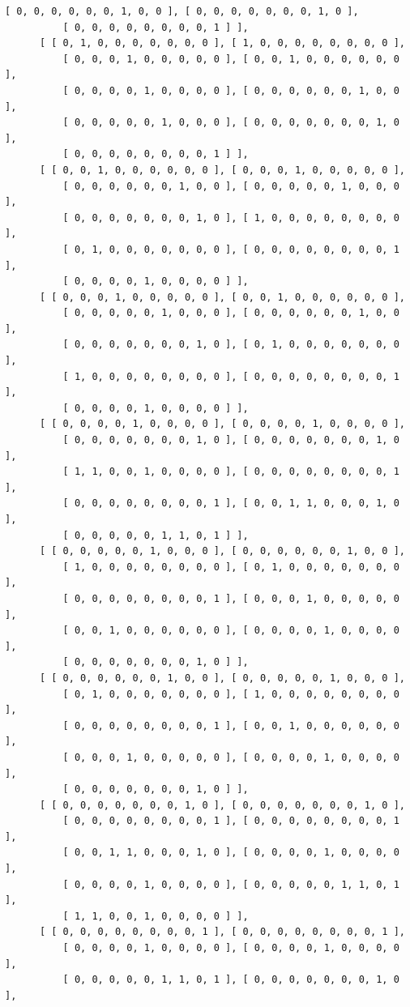 \documentclass[a4paper, 10pt]{book}
\theoremstyle{definition}
\numberwithin{equation}{chapter}
\begin{document}
\begin{appendices}
\begin{enumerate}
\begin{lstlisting}[numbers=none]
          [ 0, 0, 0, 0, 0, 0, 1, 0, 0 ], [ 0, 0, 0, 0, 0, 0, 0, 1, 0 ], 
          [ 0, 0, 0, 0, 0, 0, 0, 0, 1 ] ], 
      [ [ 0, 1, 0, 0, 0, 0, 0, 0, 0 ], [ 1, 0, 0, 0, 0, 0, 0, 0, 0 ], 
          [ 0, 0, 0, 1, 0, 0, 0, 0, 0 ], [ 0, 0, 1, 0, 0, 0, 0, 0, 0 ], 
          [ 0, 0, 0, 0, 1, 0, 0, 0, 0 ], [ 0, 0, 0, 0, 0, 0, 1, 0, 0 ], 
          [ 0, 0, 0, 0, 0, 1, 0, 0, 0 ], [ 0, 0, 0, 0, 0, 0, 0, 1, 0 ], 
          [ 0, 0, 0, 0, 0, 0, 0, 0, 1 ] ], 
      [ [ 0, 0, 1, 0, 0, 0, 0, 0, 0 ], [ 0, 0, 0, 1, 0, 0, 0, 0, 0 ], 
          [ 0, 0, 0, 0, 0, 0, 1, 0, 0 ], [ 0, 0, 0, 0, 0, 1, 0, 0, 0 ], 
          [ 0, 0, 0, 0, 0, 0, 0, 1, 0 ], [ 1, 0, 0, 0, 0, 0, 0, 0, 0 ], 
          [ 0, 1, 0, 0, 0, 0, 0, 0, 0 ], [ 0, 0, 0, 0, 0, 0, 0, 0, 1 ], 
          [ 0, 0, 0, 0, 1, 0, 0, 0, 0 ] ], 
      [ [ 0, 0, 0, 1, 0, 0, 0, 0, 0 ], [ 0, 0, 1, 0, 0, 0, 0, 0, 0 ], 
          [ 0, 0, 0, 0, 0, 1, 0, 0, 0 ], [ 0, 0, 0, 0, 0, 0, 1, 0, 0 ], 
          [ 0, 0, 0, 0, 0, 0, 0, 1, 0 ], [ 0, 1, 0, 0, 0, 0, 0, 0, 0 ], 
          [ 1, 0, 0, 0, 0, 0, 0, 0, 0 ], [ 0, 0, 0, 0, 0, 0, 0, 0, 1 ], 
          [ 0, 0, 0, 0, 1, 0, 0, 0, 0 ] ], 
      [ [ 0, 0, 0, 0, 1, 0, 0, 0, 0 ], [ 0, 0, 0, 0, 1, 0, 0, 0, 0 ], 
          [ 0, 0, 0, 0, 0, 0, 0, 1, 0 ], [ 0, 0, 0, 0, 0, 0, 0, 1, 0 ], 
          [ 1, 1, 0, 0, 1, 0, 0, 0, 0 ], [ 0, 0, 0, 0, 0, 0, 0, 0, 1 ], 
          [ 0, 0, 0, 0, 0, 0, 0, 0, 1 ], [ 0, 0, 1, 1, 0, 0, 0, 1, 0 ], 
          [ 0, 0, 0, 0, 0, 1, 1, 0, 1 ] ], 
      [ [ 0, 0, 0, 0, 0, 1, 0, 0, 0 ], [ 0, 0, 0, 0, 0, 0, 1, 0, 0 ], 
          [ 1, 0, 0, 0, 0, 0, 0, 0, 0 ], [ 0, 1, 0, 0, 0, 0, 0, 0, 0 ], 
          [ 0, 0, 0, 0, 0, 0, 0, 0, 1 ], [ 0, 0, 0, 1, 0, 0, 0, 0, 0 ], 
          [ 0, 0, 1, 0, 0, 0, 0, 0, 0 ], [ 0, 0, 0, 0, 1, 0, 0, 0, 0 ], 
          [ 0, 0, 0, 0, 0, 0, 0, 1, 0 ] ], 
      [ [ 0, 0, 0, 0, 0, 0, 1, 0, 0 ], [ 0, 0, 0, 0, 0, 1, 0, 0, 0 ], 
          [ 0, 1, 0, 0, 0, 0, 0, 0, 0 ], [ 1, 0, 0, 0, 0, 0, 0, 0, 0 ], 
          [ 0, 0, 0, 0, 0, 0, 0, 0, 1 ], [ 0, 0, 1, 0, 0, 0, 0, 0, 0 ], 
          [ 0, 0, 0, 1, 0, 0, 0, 0, 0 ], [ 0, 0, 0, 0, 1, 0, 0, 0, 0 ], 
          [ 0, 0, 0, 0, 0, 0, 0, 1, 0 ] ], 
      [ [ 0, 0, 0, 0, 0, 0, 0, 1, 0 ], [ 0, 0, 0, 0, 0, 0, 0, 1, 0 ], 
          [ 0, 0, 0, 0, 0, 0, 0, 0, 1 ], [ 0, 0, 0, 0, 0, 0, 0, 0, 1 ], 
          [ 0, 0, 1, 1, 0, 0, 0, 1, 0 ], [ 0, 0, 0, 0, 1, 0, 0, 0, 0 ], 
          [ 0, 0, 0, 0, 1, 0, 0, 0, 0 ], [ 0, 0, 0, 0, 0, 1, 1, 0, 1 ], 
          [ 1, 1, 0, 0, 1, 0, 0, 0, 0 ] ], 
      [ [ 0, 0, 0, 0, 0, 0, 0, 0, 1 ], [ 0, 0, 0, 0, 0, 0, 0, 0, 1 ], 
          [ 0, 0, 0, 0, 1, 0, 0, 0, 0 ], [ 0, 0, 0, 0, 1, 0, 0, 0, 0 ], 
          [ 0, 0, 0, 0, 0, 1, 1, 0, 1 ], [ 0, 0, 0, 0, 0, 0, 0, 1, 0 ], 

\end{lstlisting}
\end{enumerate}
\end{appendices}
\end{document}
